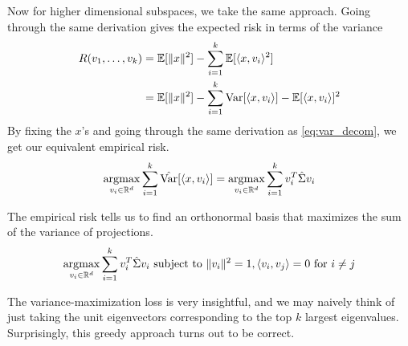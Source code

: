   Now for higher dimensional subspaces, we take the same approach. Going through the same derivation gives the expected risk in terms of the variance 
  \begin{align}
    R(v_1, \ldots, v_k) 
    & = \mathbb{E}[\|x\|^2] - \sum_{i=1}^k \mathbb{E}[ \langle x, v_i \rangle^2 ] \\ 
    & = \mathbb{E}[\|x\|^2] - \sum_{i=1}^k \operatorname{Var}[\langle x, v_i \rangle ] - \mathbb{E}[ \langle x, v_i \rangle ]^2 
  \end{align} 
  By fixing the $x$'s and going through the same derivation as \ref{eq:var_decom}, we get our equivalent empirical risk. 
  \begin{equation}
    \operatorname*{\arg\!\max}_{v_i \in \mathbb{R}^d} \sum_{i=1}^k \hat{\operatorname{Var}}[\langle x, v_i \rangle] = \operatorname*{\arg\!\max}_{v_i \in \mathbb{R}^d} \sum_{i=1}^k v_i^T \hat{\Sigma} v_i
  \end{equation}

  \begin{theorem}
    \label{thm:constrained-empirical-risk-of-kth-principal-2}
    The empirical risk tells us to find an orthonormal basis that maximizes the sum of the variance of projections. 
    \begin{equation}
      \operatorname*{\arg\!\max}_{v_i \in \mathbb{R}^d} \sum_{i=1}^k  v_i^T \hat{\Sigma} v_i \text{ subject to } \|v_i\|^2 = 1, \langle v_i, v_j \rangle = 0 \text{ for } i \neq j
    \end{equation}
  \end{theorem}

  The variance-maximization loss is very insightful, and we may naively think of just taking the unit eigenvectors corresponding to the top $k$ largest eigenvalues. Surprisingly, this greedy approach turns out to be correct. 

